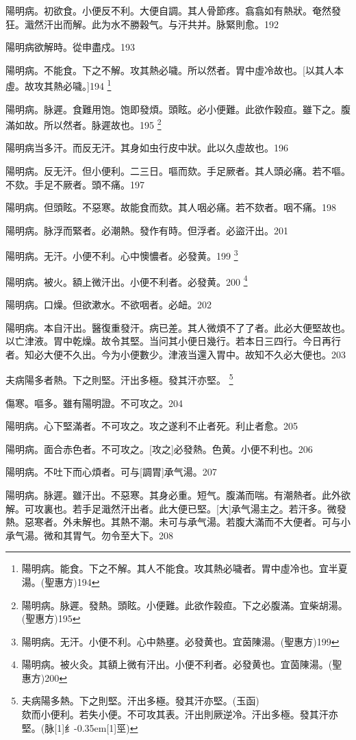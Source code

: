 \documentclass[11pt,oneside,b5paper]{ctexbook}
\begin{document}
\begin{flushleft}
陽明病。初欲食。小便反不利。大便自調。其人骨節疼。翕翕如有熱狀。奄然發狂。濈然汗出而解。此为水不勝穀气。与汗共并。脉緊則愈。192

陽明病欲解時。從申盡戍。193

陽明病。不能食。下之不解。攻其熱必噦。所以然者。胃中虛冷故也。[以其人本虛。故攻其熱必噦。]194
\footnote{陽明病。能食。下之不解。其人不能食。攻其熱必噦者。胃中虛冷也。宜半夏湯。(聖惠方)194}

陽明病。脉遲。食難用饱。饱即發煩。頭眩。必小便難。此欲作穀疸。雖下之。腹滿如故。所以然者。脉遲故也。195
\footnote{陽明病。脉遲。發熱。頭眩。小便難。此欲作榖疸。下之必腹滿。宜柴胡湯。(聖惠方)195}

陽明病当多汗。而反无汗。其身如虫行皮中狀。此以久虛故也。196

陽明病。反无汗。但小便利。二三日。嘔而欬。手足厥者。其人頭必痛。若不嘔。不欬。手足不厥者。頭不痛。197

陽明病。但頭眩。不惡寒。故能食而欬。其人咽必痛。若不欬者。咽不痛。198

陽明病。脉浮而緊者。必潮熱。發作有時。但浮者。必盜汗出。201

陽明病。无汗。小便不利。心中懊憹者。必發黄。199
\footnote{陽明病。无汗。小便不利。心中熱壅。必發黄也。宜茵陳湯。(聖惠方)199}

陽明病。被火。額上微汗出。小便不利者。必發黄。200
\footnote{陽明病。被火灸。其額上微有汗出。小便不利者。必發黄也。宜茵陳湯。(聖惠方)200}

陽明病。口燥。但欲漱水。不欲咽者。必衄。202

陽明病。本自汗出。醫復重發汗。病已差。其人微煩不了了者。此必大便堅故也。以亡津液。胃中乾燥。故令其堅。当问其小便日幾行。若本日三四行。今日再行者。知必大便不久出。今为小便數少。津液当還入胃中。故知不久必大便也。203

夫病陽多者熱。下之則堅。汗出多極。發其汗亦堅。
\footnote{夫病陽多熱。下之則堅。汗出多極。發其汗亦堅。(玉函)\\欬而小便利。若失小便。不可攻其表。汗出則厥逆冷。汗出多極。發其汗亦堅。(脉{\hbox{\scalebox{0.68}[1]{纟}\kern-0.35em\scalebox{0.64}[1]{巠}}})}

傷寒。嘔多。雖有陽明證。不可攻之。204

陽明病。心下堅滿者。不可攻之。攻之遂利不止者死。利止者愈。205

陽明病。面合赤色者。不可攻之。[攻之]必發熱。色黄。小便不利也。206

陽明病。不吐下而心煩者。可与[調胃]承气湯。207

陽明病。脉遲。雖汗出。不惡寒。其身必重。短气。腹滿而喘。有潮熱者。此外欲解。可攻裏也。若手足濈然汗出者。此大便已堅。[大]承气湯主之。若汗多。微發熱。惡寒者。外未解也。其熱不潮。未可与承气湯。若腹大滿而不大便者。可与小承气湯。微和其胃气。勿令至大下。208


\end{flushleft}
\end{document}
